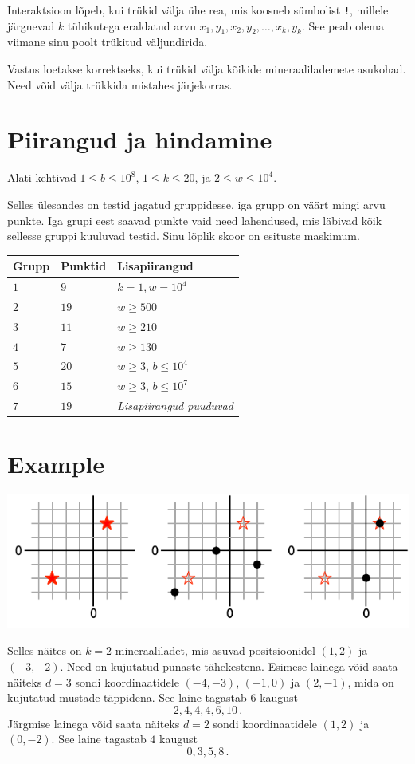 Interaktsioon lõpeb, kui trükid välja ühe rea, mis koosneb sümbolist \texttt{!}, millele järgnevad $k$ tühikutega eraldatud arvu $x_1, y_1, x_2, y_2, \ldots, x_k, y_k$.
See peab olema viimane sinu poolt trükitud väljundirida.

Vastus loetakse korrektseks, kui trükid välja kõikide mineraalilademete asukohad.
Need võid välja trükkida mistahes järjekorras.

\section*{Piirangud ja hindamine}

Alati kehtivad
$1\leq b \leq 10^8$, %
$1 \leq k \leq 20$, %
ja
$2 \le w \le 10^4$. %

Selles ülesandes on testid jagatud gruppidesse, iga grupp on väärt mingi arvu punkte.
Iga grupi eest saavad punkte vaid need lahendused, mis läbivad kõik sellesse gruppi kuuluvad testid.
Sinu lõplik skoor on esituste maskimum.

\medskip
\begin{tabular}{lll}
Grupp & Punktid & Lisapiirangud \\\hline
  $1$ & $9$ & $k = 1, w = 10^4$\\
  $2$ & $19$ & $w \ge 500$\\
  $3$ & $11$ & $w \ge 210$\\
  $4$ & $7$ & $w \ge 130$\\
  $5$ & $20$ & $w \ge 3$, $b \le 10^4$\\
  $6$ & $15$ & $w \ge 3$, $b \le 10^7$\\
  $7$ & $19$ & \emph{Lisapiirangud puuduvad}
\end{tabular}

\section*{Example}

\includegraphics[width=.6\textwidth]{img/sample1.pdf}

Selles näites on $k=2$ mineraaliladet, mis asuvad positsioonidel $(1,2)$ ja $(-3,-2)$. Need on kujutatud punaste tähekestena.
Esimese lainega võid saata näiteks $d=3$ sondi koordinaatidele $(-4,-3)$, $(-1, 0)$ ja $(2,-1)$, mida on kujutatud mustade täppidena.
See laine tagastab $6$ kaugust \[
  2, 4, 4, 4, 6, 10\,.
\]
Järgmise lainega võid saata näiteks $d=2$ sondi koordinaatidele $(1,2)$ ja $(0,-2)$.
See laine tagastab $4$ kaugust \[
  0, 3, 5, 8\,.
\]
